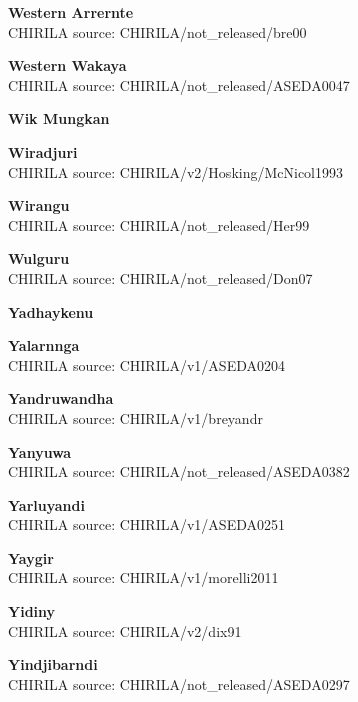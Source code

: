 \textbf{Western Arrernte}\\
CHIRILA source: CHIRILA/not\_released/bre00


\textbf{Western Wakaya}\\
CHIRILA source: CHIRILA/not\_released/ASEDA0047


\textbf{Wik Mungkan}\\

\textbf{Wiradjuri}\\
CHIRILA source: CHIRILA/v2/Hosking/McNicol1993


\textbf{Wirangu}\\
CHIRILA source: CHIRILA/not\_released/Her99


\textbf{Wulguru}\\
CHIRILA source: CHIRILA/not\_released/Don07


\textbf{Yadhaykenu}\\

\textbf{Yalarnnga}\\
CHIRILA source: CHIRILA/v1/ASEDA0204


\textbf{Yandruwandha}\\
CHIRILA source: CHIRILA/v1/breyandr

\textbf{Yanyuwa}\\
CHIRILA source: CHIRILA/not\_released/ASEDA0382


\textbf{Yarluyandi}\\
CHIRILA source: CHIRILA/v1/ASEDA0251


\textbf{Yaygir}\\
CHIRILA source: CHIRILA/v1/morelli2011


\textbf{Yidiny}\\
CHIRILA source: CHIRILA/v2/dix91


\textbf{Yindjibarndi}\\
CHIRILA source: CHIRILA/not\_released/ASEDA0297


